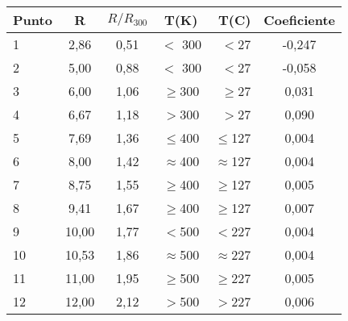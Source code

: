\begin{tabular}{|l|c|c|c|r|c|}
\hline
Punto	&R	&$R/R_300$	&T(K)	&T(C)  &Coeficiente \\\hline
1	&2,86	&0,51	&$<$ 300	&$<$27  &-0,247\\
2	&5,00	&0,88	&$<$ 300	&$<$27  &-0,058\\
3	&6,00	&1,06	&$\geq$300	&$\geq$27   &0,031\\
4	&6,67	&1,18	&$>$300	&$>$27  &0,090\\
5	&7,69	&1,36	&$\leq$400	&$\leq$127  &0,004\\
6	&8,00	&1,42	&$\approx$400	&$\approx$127   &0,004\\
7	&8,75	&1,55	&$\geq$400	&$\geq$127  &0,005\\
8	&9,41	&1,67	&$\geq$400	&$\geq$127  &0,007\\
9	&10,00	&1,77	&$<$500	&$<$227 &0,004\\
10	&10,53	&1,86	&$\approx$500	&$\approx$227   &0,004\\
11	&11,00	&1,95	&$\geq$500	&$\geq$227  &0,005\\
12	&12,00	&2,12	&$>$500	&$>$227 &0,006\\ \hline
\end{tabular}